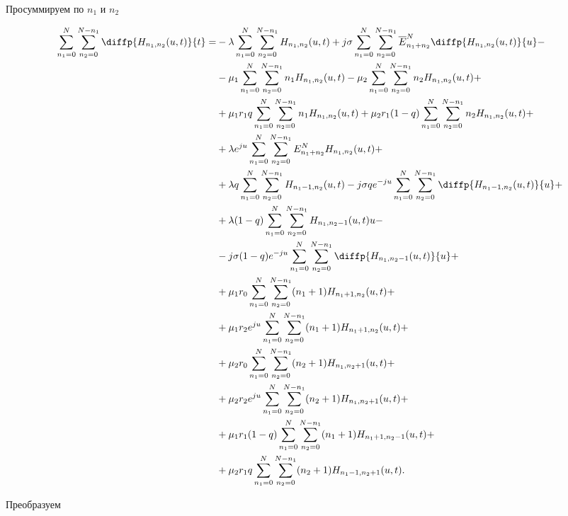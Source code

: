 Просуммируем по $n_{1}$ и $n_{2}$

\begin{equation*}
\begin{aligned}
	\sum_{n_1=0}^N \sum_{n_2=0}^{N-n_1}\diffp{H_{n_1,n_2}(u,t)}{t}=
	&-\lambda \sum_{n_1=0}^N\sum_{n_2=0}^{N-n_1}
	H_{n_1, n_2}(u,t)
	+j\sigma \sum_{n_1=0}^N\sum_{n_2=0}^{N-n_1}
	\overline{E}^N_{n_1+n_2}\diffp{H_{n_1, n_2}(u,t)}{u}-\\
	&-\mu_1 \sum_{n_1=0}^N\sum_{n_2=0}^{N-n_1}
	n_1 H_{n_1, n_2}(u,t)
	-\mu_2 \sum_{n_1=0}^N\sum_{n_2=0}^{N-n_1}
	n_2 H_{n_1, n_2}(u,t)+\\
	&+\mu_1 r_1 q \sum_{n_1=0}^N\sum_{n_2=0}^{N-n_1}
	n_1 H_{n_1, n_2}(u,t)
	+\mu_2 r_1 (1-q)\sum_{n_1=0}^N\sum_{n_2=0}^{N-n_1} 
	n_2 H_{n_1, n_2}(u,t)+\\
	&+\lambda e^{ju}\sum_{n_1=0}^N\sum_{n_2=0}^{N-n_1}
	E^N_{n_1+n_2}H_{n_1, n_2}(u,t)+\\
	&+\lambda q \sum_{n_1=0}^N\sum_{n_2=0}^{N-n_1}
	H_{n_1-1, n_2}(u,t)-j \sigma q e^{-ju}\sum_{n_1=0}^N\sum_{n_2=0}^{N-n_1}
	\diffp{H_{n_1-1, n_2}(u,t)}{u}+\\
	&+\lambda (1-q) \sum_{n_1=0}^N\sum_{n_2=0}^{N-n_1}
	H_{n_1, n_2-1}(u,t){u}-\\
	&-j \sigma (1-q) e^{-ju}\sum_{n_1=0}^N\sum_{n_2=0}^{N-n_1}
	\diffp{H_{n_1, n_2-1}(u,t)}{u}+\\
	&+\mu_1 r_0 \sum_{n_1=0}^N\sum_{n_2=0}^{N-n_1}
	(n_1+1) H_{n_1+1, n_2}(u,t)+\\
	&+\mu_1 r_2 e^{ju} \sum_{n_1=0}^N\sum_{n_2=0}^{N-n_1}
	(n_1+1) H_{n_1+1, n_2}(u,t)+\\
	&+\mu_2 r_0 \sum_{n_1=0}^N\sum_{n_2=0}^{N-n_1}
	(n_2+1) H_{n_1, n_2+1}(u,t)+\\
	&+\mu_2 r_2 e^{ju} \sum_{n_1=0}^N\sum_{n_2=0}^{N-n_1}
	(n_2+1) H_{n_1, n_2+1}(u,t)+\\
	&+\mu_1 r_1 (1-q) \sum_{n_1=0}^N\sum_{n_2=0}^{N-n_1}
	(n_1+1)H_{n_1+1, n_2-1}(u,t)+\\
	&+\mu_2 r_1 q \sum_{n_1=0}^N\sum_{n_2=0}^{N-n_1}
	(n_2+1)H_{n_1-1, n_2+1}(u,t).\\	
\end{aligned}
\end{equation*}

Преобразуем

